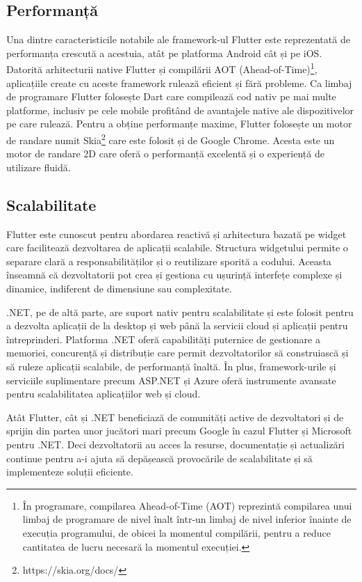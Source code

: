 \newpage

\subsection{Performanță}

Una dintre caracteristicile notabile ale framework-ul Flutter este reprezentată de performanța crescută a acestuia, atât pe platforma Android cât și pe iOS. Datorită arhitecturii native Flutter și compilării AOT (Ahead-of-Time)\footnote{În programare, compilarea Ahead-of-Time (AOT) reprezintă compilarea unui limbaj de programare de nivel înalt într-un limbaj de nivel inferior înainte de execuția programului, de obicei la momentul compilării, pentru a reduce cantitatea de lucru necesară la momentul execuției.}, aplicațiile create cu aceste framework rulează eficient și fără probleme. Ca limbaj de programare Flutter folosește Dart care compilează cod nativ pe mai multe platforme, inclusiv pe cele mobile profitând de avantajele native ale dispozitivelor pe care rulează. Pentru a obține performanțe maxime, Flutter folosește un motor de randare numit Skia\footnote{https://skia.org/docs/} care este folosit și de Google Chrome. Acesta este un motor de randare 2D care oferă o performanță excelentă și o experiență de utilizare fluidă.

\subsection{Scalabilitate}

Flutter este cunoscut pentru abordarea reactivă și arhitectura bazată pe widget care facilitează dezvoltarea de aplicații scalabile. Structura widgetului permite o separare clară a responsabilităților și o reutilizare sporită a codului. Aceasta înseamnă că dezvoltatorii pot crea și gestiona cu ușurință interfețe complexe și dinamice, indiferent de dimensiune sau complexitate.

.NET, pe de altă parte, are suport nativ pentru scalabilitate și este folosit pentru a dezvolta aplicații de la desktop și web până la servicii cloud și aplicații pentru întreprinderi. Platforma .NET oferă capabilități puternice de gestionare a memoriei, concurență și distribuție care permit dezvoltatorilor să construiască și să ruleze aplicații scalabile, de performanță înaltă. În plus, framework-urile și serviciile suplimentare precum ASP.NET și Azure oferă instrumente avansate pentru scalabilitatea aplicațiilor web și cloud.

Atât Flutter, cât și .NET beneficiază de comunități active de dezvoltatori și de sprijin din partea unor jucători mari precum Google în cazul Flutter și Microsoft pentru .NET. Deci dezvoltatorii au acces la resurse, documentație și actualizări continue pentru a-i ajuta să depășească provocările de scalabilitate și să implementeze soluții eficiente.


